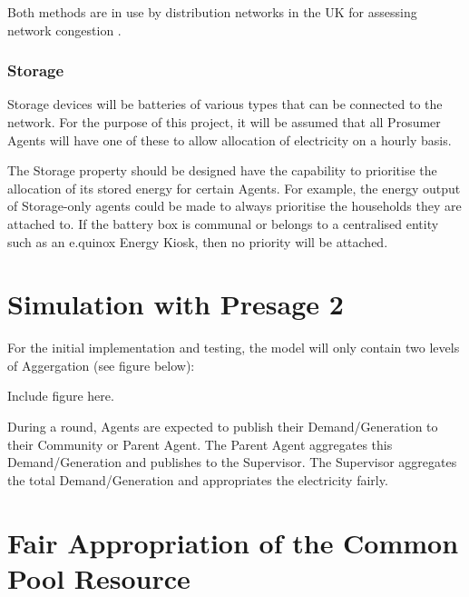 Both methods are in use by distribution networks in the UK for assessing network congestion \cite{IPSA-web-constraint:2015}. \

\subsubsection*{Storage}
Storage devices will be batteries of various types that can be connected to the network. For the purpose of this project, it will be assumed that all Prosumer Agents will have one of these to allow allocation of electricity on a hourly basis.

The Storage property should be designed have the capability to prioritise the allocation of its stored energy for certain Agents. For example, the energy output of Storage-only agents could be made to always prioritise the households they are attached to. If the battery box is communal or belongs to a centralised entity such as an e.quinox Energy Kiosk, then no priority will be attached.

\section*{Simulation with Presage 2}
For the initial implementation and testing, the model will only contain two levels of Aggergation (see figure below): 

Include figure here.

During a round, Agents are expected to publish their Demand/Generation to their Community or Parent Agent. The Parent Agent aggregates this Demand/Generation and publishes to the Supervisor. The Supervisor aggregates the total Demand/Generation and appropriates the electricity fairly.

\section*{Fair Appropriation of the Common Pool Resource}







